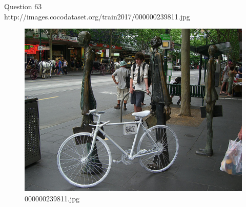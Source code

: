 Question 63\\
http://images.cocodataset.org/train2017/000000239811.jpg
\begin{figure}[h]
    \centering
    \includegraphics[width=0.8\linewidth]{../image set/hard/000000239811.jpg}
    \caption{000000239811.jpg}
\end{figure}
